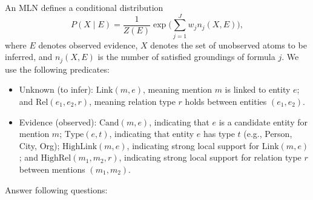 \documentclass[11pt,a4paper]{article}
\begin{document}
An MLN defines a conditional distribution
\[
P(X \mid E) = \frac{1}{Z(E)} \exp\Biggl( \sum_{j=1}^{J} w_j n_j(X, E) \Biggr),
\]
where $E$ denotes observed evidence, $X$ denotes the set of unobserved atoms to be inferred, and $n_j(X, E)$ is the number of satisfied groundings of formula $j$. We use the following predicates:
\begin{itemize}
    \item Unknown (to infer): $\mathrm{Link}(m, e)$, meaning mention $m$ is linked to entity $e$; and $\mathrm{Rel}(e_1, e_2, r)$, meaning relation type $r$ holds between entities $(e_1, e_2)$.
    \item Evidence (observed): $\mathrm{Cand}(m, e)$, indicating that $e$ is a candidate entity for mention $m$; $\mathrm{Type}(e, t)$, indicating that entity $e$ has type $t$ (e.g., Person, City, Org); $\mathrm{HighLink}(m, e)$, indicating strong local support for $\mathrm{Link}(m, e)$; and $\mathrm{HighRel}(m_1, m_2, r)$, indicating strong local support for relation type $r$ between mentions $(m_1, m_2)$.
\end{itemize}
Answer following questions:
\end{document}
